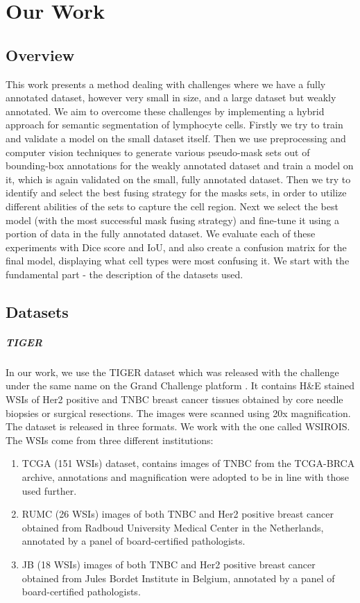\chapter{Our Work}
\label{chap:prelim-exp}

\section{Overview}
This work presents a method dealing with challenges where we have a fully annotated dataset, however very small in size, and a large dataset but weakly annotated. We aim to overcome these challenges by implementing a hybrid approach for semantic segmentation of lymphocyte cells. Firstly we try to train and validate a model on the small dataset itself. Then we use preprocessing and computer vision techniques to generate various pseudo-mask sets out of bounding-box annotations for the weakly annotated dataset and train a model on it, which is again validated on the small, fully annotated dataset. Then we try to identify and select the best fusing strategy for the masks sets, in order to utilize different abilities of the sets to capture the cell region. Next we select the best model (with the most successful mask fusing strategy) and fine-tune it using a portion of data in the fully annotated dataset. We evaluate each of these experiments with Dice score and IoU, and also create a confusion matrix for the final model, displaying what cell types were most confusing it. We start with the fundamental part - the description of the datasets used.

\section{Datasets}
\label{sec:datasets}

\paragraph{TIGER} In our work, we use the TIGER dataset which was released with the challenge under the same name on the Grand Challenge platform \cite{tiger_dataset}. It contains H\&E stained WSIs of Her2 positive and TNBC breast cancer tissues obtained by core needle biopsies or surgical resections. The images were scanned using 20x magnification. The dataset is released in three formats. We work with the one called WSIROIS. The WSIs come from three different institutions:

\begin{enumerate}
    \item TCGA (151 WSIs) dataset, contains images of TNBC from the TCGA-BRCA archive, annotations and magnification were adopted to be in line with those used further.
    \item RUMC (26 WSIs) images of both TNBC and Her2 positive breast cancer obtained from Radboud University Medical Center in the Netherlands, annotated by a panel of board-certified pathologists.
    \item JB (18 WSIs) images of both TNBC and Her2 positive breast cancer obtained from Jules Bordet Institute in Belgium, annotated by a panel of board-certified pathologists.
\end{enumerate}

